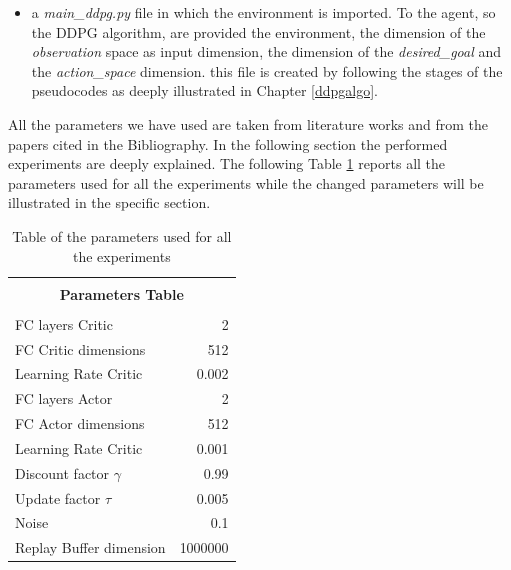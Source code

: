 \documentclass[a4paper]{report}
\begin{document}
\begin{itemize}
\item a \textit{main\_ddpg.py} file in which the environment is imported. To the agent, so the DDPG algorithm, are provided the environment, the dimension of the \textit{observation} space as input dimension, the dimension of the \textit{desired\_goal} and the \textit{action\_space} dimension. this file is created by following the stages of the pseudocodes as deeply illustrated in Chapter \ref{ddpgalgo}.

\end{itemize}

All the parameters we have used are taken from literature works and from the papers cited in the Bibliography. In the following section the performed experiments are deeply explained. The following Table \ref{table} reports all the parameters used for all the experiments while the changed parameters will be illustrated in the specific section.
\\

\begin{table}[h]
\begin{center}
\begin{tabular}{|l|r|} 



\hline

\multicolumn{2}{|c|}{}\\
\multicolumn{2}{|c|}{\textbf{\Large            Parameters Table}}\\
\multicolumn{2}{|c|}{}\\

\hline

FC layers Critic 			& 2			\\
FC Critic dimensions		& 512		\\
Learning Rate Critic 		& 0.002		\\
FC layers Actor 			& 2			\\
FC Actor dimensions 		& 512		\\
Learning Rate Critic 		& 0.001		\\
Discount factor $\gamma$	& 0.99		\\
Update factor $\tau$		& 0.005		\\	%
Noise						& 0.1		\\
Replay Buffer dimension		& 1000000	\\

\hline
\end{tabular}
\end{center}
\caption{\label{table} Table of the parameters used for all the experiments}
\end{table}
\end{document}
